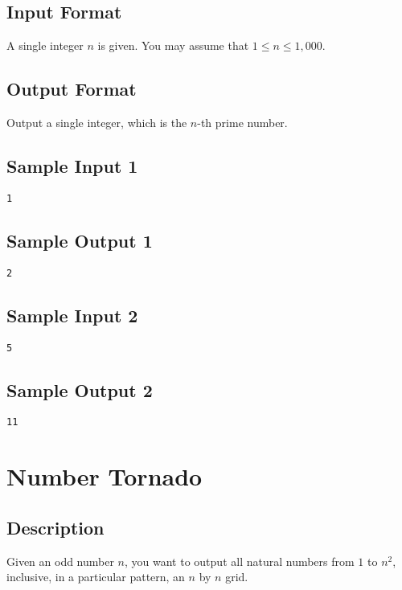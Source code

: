 \subsection*{Input Format}
A single integer $n$ is given. You may assume that $1 \leq n \leq 1,000$. 

\subsection*{Output Format}
Output a single integer, which is the $n$-th prime number.

\subsection*{Sample Input 1}
\begin{verbatim}
1
\end{verbatim}

\subsection*{Sample Output 1}
\begin{verbatim}
2
\end{verbatim}

\subsection*{Sample Input 2}
\begin{verbatim}
5
\end{verbatim}

\subsection*{Sample Output 2}
\begin{verbatim}
11
\end{verbatim}



\newpage


\section{Number Tornado}

\subsection*{Description}
Given an odd number $n$, you want to output all natural numbers from $1$ to $n^2$, inclusive, in a particular pattern, an $n$ by $n$ grid.
 

